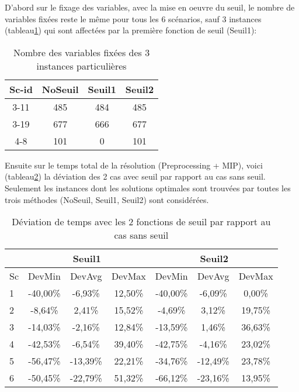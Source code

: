 D'abord sur le fixage des variables, avec la mise en oeuvre du seuil, le nombre de variables fixées reste le même pour tous les 6 scénarios, sauf 3 instances (tableau\ref{tab_cut2_seuil_fix_cmp}) qui sont affectées par la première fonction de seuil (Seuil1):
\begin{table}[h]
    \centering
    \begin{tabular}{|c|c|c|c|}
    	\hline
Sc-id& 	NoSeuil	& Seuil1	& Seuil2\\ \hline
3-11 & 	485	& 484	& 485      \\ \hline
3-19 & 	677	& 666	& 677      \\ \hline
4-8 & 	101	& 0	& 101     		\\ \hline
    \end{tabular}
    \caption{Nombre des variables fixées des 3 instances particulières}
    \label{tab_cut2_seuil_fix_cmp}
\end{table}
\bigskip

Ensuite sur le temps total de la résolution (Preprocessing + MIP), voici (tableau\ref{tab_cut2_seuil_tim_cmp}) la déviation des 2 cas avec seuil par rapport au cas sans seuil. Seulement les instances dont les solutions optimales sont trouvées par toutes les trois méthodes (NoSeuil, Seuil1, Seuil2) sont considérées.
\begin{table}[h]
    \centering
    \begin{tabular}{|l|c|c|c|c|c|c|}
    	\hline
  &\multicolumn{3}{c}{Seuil1}	&\multicolumn{3}{|c|}{Seuil2}\\ \hline

Sc  & 	DevMin	& DevAvg	& DevMax& 	DevMin	& DevAvg	&DevMax  \\ \hline
1&-40,00\%&	 -6,93\%&	12,50\%&	-40,00\%&	 -6,09\%&	 0,00\%\\ \hline
2& -8,64\%&	  2,41\%&	15,52\%&	 -4,69\%&	  3,12\%&	19,75\%\\ \hline
3&-14,03\%&	 -2,16\%&	12,84\%&	-13,59\%&	  1,46\%&	36,63\%\\ \hline
4&-42,53\%&	 -6,54\%&	39,40\%&	-42,75\%&	 -4,16\%&	23,02\%\\ \hline
5&-56,47\%&	-13,39\%&	22,21\%&	-34,76\%&	-12,49\%&	23,78\%\\ \hline
6&-50,45\%&	-22,79\%&	51,32\%&	-66,12\%&	-23,16\%&	13,95\%\\ \hline
    \end{tabular}
    \caption{Déviation de temps avec les 2 fonctions de seuil par rapport au cas sans seuil}
    \label{tab_cut2_seuil_tim_cmp}
\end{table}
\bigskip

